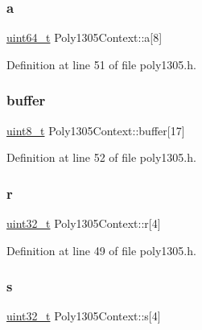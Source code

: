 \subsubsection{\texorpdfstring{a}{a}}
{\footnotesize\ttfamily \hyperlink{stdint_8h_aec6fcb673ff035718c238c8c9d544c47}{uint64\+\_\+t} Poly1305\+Context\+::a\mbox{[}8\mbox{]}}



Definition at line 51 of file poly1305.\+h.

\mbox{\label{structPoly1305Context_a91d2142b82af28b80579e63ab1f9f2b3}} 
\subsubsection{\texorpdfstring{buffer}{buffer}}
{\footnotesize\ttfamily \hyperlink{stdint_8h_aba7bc1797add20fe3efdf37ced1182c5}{uint8\+\_\+t} Poly1305\+Context\+::buffer\mbox{[}17\mbox{]}}



Definition at line 52 of file poly1305.\+h.

\mbox{\label{structPoly1305Context_a7194202b23c39cda66f4feae4689895e}} 
\subsubsection{\texorpdfstring{r}{r}}
{\footnotesize\ttfamily \hyperlink{stdint_8h_a435d1572bf3f880d55459d9805097f62}{uint32\+\_\+t} Poly1305\+Context\+::r\mbox{[}4\mbox{]}}



Definition at line 49 of file poly1305.\+h.

\mbox{\label{structPoly1305Context_a01116bfecf43bff20e0bedd9368851a2}} 
\subsubsection{\texorpdfstring{s}{s}}
{\footnotesize\ttfamily \hyperlink{stdint_8h_a435d1572bf3f880d55459d9805097f62}{uint32\+\_\+t} Poly1305\+Context\+::s\mbox{[}4\mbox{]}}



